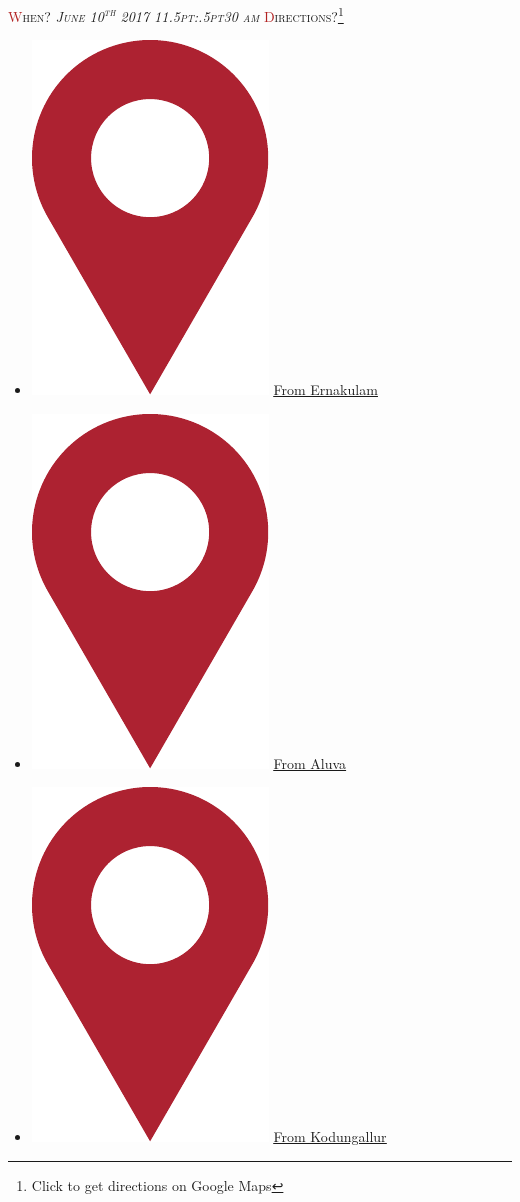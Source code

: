 \documentclass{article}
\newcommand{\h}[1]{\textcolor{FireBrick}{#1}}
\newcommand*{\pin}{%
  \includegraphics[height=\heightof{M}]{pin}%
}
\begin{document}
{\scshape \h{W}hen?}
{\small \emph \textit{%
  \scshape June 10\/\rlap{,}\textsuperscript{th} 2017
  11\kern.5pt:\kern.5pt30 am
}}
\medbreak
{\scshape \h{D}irections?}\footnote{Click to get directions on Google Maps}
\begin{itemize}
	\item[] {\normalsize \pin} \underline{\href{https://www.google.co.in/maps/dir/Mount+Carmel+Church,+Pottakuzhi+-+Mamangalam+Rd,+Mamangalam,+Elamakkara,+Ernakulam,+Kerala+682025/Cherai+Beach+Resorts,+Cherai,+Vypin,+Kerala/@10.0633394,76.1809834,12z/data=!3m1!4b1!4m13!4m12!1m5!1m1!1s0x3b080d0fa96af125:0x696a9989e82b6c02!2m2!1d76.3032795!2d10.0093666!1m5!1m1!1s0x3b0810a300000001:0xebdd3e12cda825ee!2m2!1d76.1986595!2d10.1363985}{From Ernakulam}}

	\item[] {\normalsize \pin} \underline{\href{https://www.google.co.in/maps/dir/Aluva+Railway+Station,+Periyar+Nagar,+Aluva,+Kerala/Cherai+Beach+Resorts,+Cherai,+Vypin,+Kerala/@10.126786,76.2902413,13.25z/data=!4m13!4m12!1m5!1m1!1s0x3b080f29eb7eb615:0xb454e4d93b04846c!2m2!1d76.3567139!2d10.1086654!1m5!1m1!1s0x3b086d34d768e025:0x4fa5702ae301f77f!2m2!1d76.1805941!2d10.1363345}{From Aluva}}
	\item[] {\normalsize \pin} \underline{\href{https://www.google.co.in/maps/dir/Kodungallur+Bhagavathy+Temple,+Kodungallur,+Kerala/Cherai+Beach+Resorts,+Cherai,+Vypin,+Kerala/@10.1821016,76.1630008,13z/data=!3m1!4b1!4m13!4m12!1m5!1m1!1s0x3b081bf47f4c042f:0x7e6f994f0db02349!2m2!1d76.1984602!2d10.2268941!1m5!1m1!1s0x3b086d34d768e025:0x4fa5702ae301f77f!2m2!1d76.1805941!2d10.1363345}{From Kodungallur}}
\end{itemize}
\end{document}
